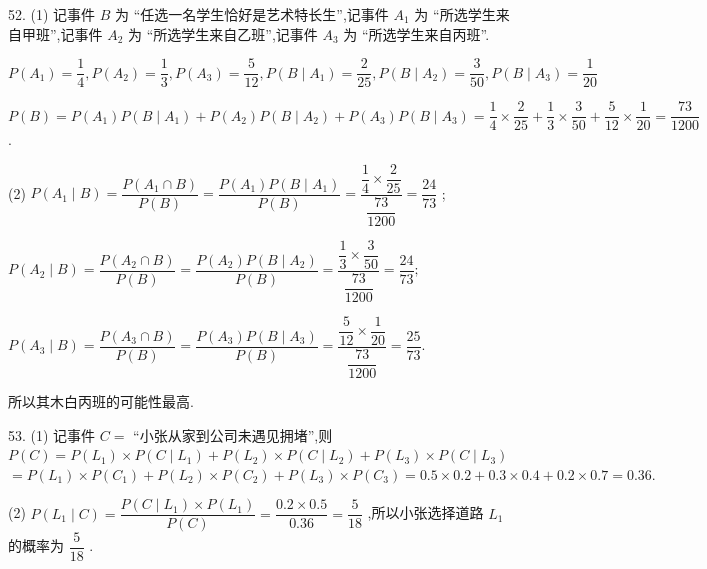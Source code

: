52. (1) 记事件 $B$ 为 “任选一名学生恰好是艺术特长生”,记事件 ${A}_{1}$ 为 “所选学生来自甲班”,记事件 ${A}_{2}$ 为 “所选学生来自乙班”,记事件 ${A}_{3}$ 为 “所选学生来自丙班”.

$P\left( {A}_{1}\right)  = \dfrac{1}{4},P\left( {A}_{2}\right)  = \dfrac{1}{3},P\left( {A}_{3}\right)  = \dfrac{5}{12},P\left( {B \mid  {A}_{1}}\right)  = \dfrac{2}{25},P\left( {B \mid  {A}_{2}}\right)  = \dfrac{3}{50},P\left( {B \mid  {A}_{3}}\right)  = \dfrac{1}{20}$

$P\left( B\right)  = P\left( {A}_{1}\right) P\left( {B \mid  {A}_{1}}\right)  + P\left( {A}_{2}\right) P\left( {B \mid  {A}_{2}}\right)  + P\left( {A}_{3}\right) P\left( {B \mid  {A}_{3}}\right)  = \dfrac{1}{4} \times  \dfrac{2}{25} + \dfrac{1}{3} \times  \dfrac{3}{50} + \dfrac{5}{12} \times  \dfrac{1}{20} = \dfrac{73}{1200}$ .

(2) $P\left( {{A}_{1} \mid  B}\right)  = \dfrac{P\left( {{A}_{1} \cap  B}\right) }{P\left( B\right) } = \dfrac{P\left( {A}_{1}\right) P\left( {B \mid  {A}_{1}}\right) }{P\left( B\right) } = \dfrac{\dfrac{1}{4} \times  \dfrac{2}{25}}{\dfrac{73}{1200}} = \dfrac{24}{73}$ ;

$P\left( {{A}_{2} \mid  B}\right)  = \dfrac{P\left( {{A}_{2} \cap  B}\right) }{P\left( B\right) } = \dfrac{P\left( {A}_{2}\right) P\left( {B \mid  {A}_{2}}\right) }{P\left( B\right) } = \dfrac{\dfrac{1}{3} \times  \dfrac{3}{50}}{\dfrac{73}{1200}} = \dfrac{24}{73};$

$P\left( {{A}_{3} \mid  B}\right)  = \dfrac{P\left( {{A}_{3} \cap  B}\right) }{P\left( B\right) } = \dfrac{P\left( {A}_{3}\right) P\left( {B \mid  {A}_{3}}\right) }{P\left( B\right) } = \dfrac{\dfrac{5}{12} \times  \dfrac{1}{20}}{\dfrac{73}{1200}} = \dfrac{25}{73}.$

所以其木白丙班的可能性最高.

53. (1) 记事件 $C =$ “小张从家到公司未遇见拥堵”,则 $P\left( C\right)  = P\left( {L}_{1}\right)  \times  P\left( {C \mid  {L}_{1}}\right)  + P\left( {L}_{2}\right)  \times  P\left( {C \mid  {L}_{2}}\right)  + P\left( {L}_{3}\right)  \times  P\left( {C \mid  {L}_{3}}\right)$  $= P\left( {L}_{1}\right)  \times  P\left( {C}_{1}\right)  + P\left( {L}_{2}\right)  \times  P\left( {C}_{2}\right)  + P\left( {L}_{3}\right)  \times  P\left( {C}_{3}\right)  = {0.5} \times  {0.2} + {0.3} \times  {0.4} + {0.2} \times  {0.7} = {0.36}.$

(2) $P\left( {{L}_{1} \mid  C}\right)  = \dfrac{P\left( {C \mid  {L}_{1}}\right)  \times  P\left( {L}_{1}\right) }{P\left( C\right) } = \dfrac{{0.2} \times  {0.5}}{0.36} = \dfrac{5}{18}$ ,所以小张选择道路 ${L}_{1}$ 的概率为 $\dfrac{5}{18}$ .

